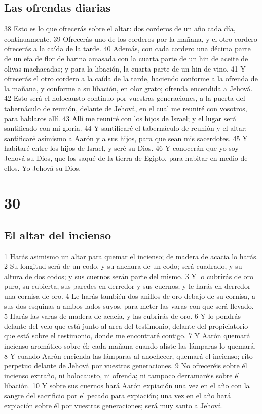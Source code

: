 \section*{Las ofrendas diarias}

38 Esto es lo que ofrecerás sobre el altar: dos corderos de un año cada día, continuamente.
39 Ofrecerás uno de los corderos por la mañana, y el otro cordero ofrecerás a la caída de la tarde.
40 Además, con cada cordero una décima parte de un efa   de flor de harina amasada con la cuarta parte de un hin de aceite de olivas machacadas; y para la libación, la cuarta parte de un hin de vino.
41 Y ofrecerás el otro cordero a la caída de la tarde, haciendo conforme a la ofrenda de la mañana, y conforme a su libación, en olor grato; ofrenda encendida a Jehová.
42 Esto será el holocausto continuo por vuestras generaciones, a la puerta del tabernáculo de reunión, delante de Jehová, en el cual me reuniré con vosotros, para hablaros allí.
43 Allí me reuniré con los hijos de Israel; y el lugar será santificado con mi gloria.
44 Y santificaré el tabernáculo de reunión y el altar; santificaré asimismo a Aarón y a sus hijos, para que sean mis sacerdotes.
45 Y habitaré entre los hijos de Israel, y seré su Dios.
46 Y conocerán que yo soy Jehová su Dios, que los saqué de la tierra de Egipto, para habitar en medio de ellos. Yo Jehová su Dios.

\chapter{30}

\section*{El altar del incienso}

1 Harás asimismo un altar para quemar el incienso; de madera de acacia lo harás.
2 Su longitud será de un codo,  y su anchura de un codo; será cuadrado, y su altura de dos codos; y sus cuernos serán parte del mismo.
3 Y lo cubrirás de oro puro, su cubierta, sus paredes en derredor y sus cuernos; y le harás en derredor una cornisa de oro.
4 Le harás también dos anillos de oro debajo de su cornisa, a sus dos esquinas a ambos lados suyos, para meter las varas con que será llevado.
5 Harás las varas de madera de acacia, y las cubrirás de oro.
6 Y lo pondrás delante del velo que está junto al arca del testimonio, delante del propiciatorio que está sobre el testimonio, donde me encontraré contigo.
7 Y Aarón quemará incienso aromático sobre él; cada mañana cuando aliste las lámparas lo quemará.
8 Y cuando Aarón encienda las lámparas al anochecer, quemará el incienso; rito perpetuo delante de Jehová por vuestras generaciones.
9 No ofreceréis sobre él incienso extraño, ni holocausto, ni ofrenda; ni tampoco derramaréis sobre él libación.
10 Y sobre sus cuernos hará Aarón expiación una vez en el año con la sangre del sacrificio por el pecado para expiación; una vez en el año hará expiación sobre él por vuestras generaciones; será muy santo a Jehová.

